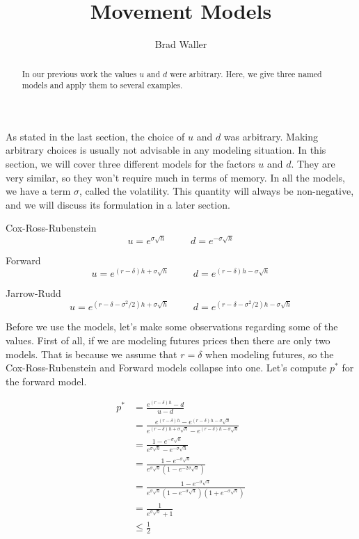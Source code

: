 \documentclass{ximera}
\author{Brad Waller}
\title{Movement Models}
\begin{document}
\begin{abstract}
In our previous work the values $u$ and $d$ were arbitrary. Here, we give three named models and apply them to several examples.
\end{abstract}

\maketitle

As stated in the last section, the choice of $u$ and $d$ was arbitrary. Making arbitrary choices is usually not advisable in any modeling situation. In this section, we will cover three different models for the factors $u$ and $d$. They are very similar, so they won't require much in terms of memory. In all the models, we have a term $\sigma$, called the volatility. This quantity will always be non-negative, and we will discuss its formulation in a later section. 

\begin{center}
Cox-Ross-Rubenstein
	\begin{equation*}
	u=e^{\sigma\sqrt{h}}	\hspace{30pt} d=e^{-\sigma\sqrt{h}}
	\end{equation*}

Forward
	\begin{equation*}
	u=e^{(r-\delta)h+\sigma\sqrt{h}}	\hspace{30pt} d=e^{(r-\delta)h-\sigma\sqrt{h}}
	\end{equation*}

Jarrow-Rudd
	\begin{equation*}
	u=e^{(r-\delta-\sigma^2/2)h+\sigma\sqrt{h}}	\hspace{30pt} d=e^{(r-\delta-\sigma^2/2)h-\sigma\sqrt{h}}
	\end{equation*}
\end{center}

Before we use the models, let's make some observations regarding some of the values. First of all, if we are modeling futures prices then there are only two models. That is because we assume that $r=\delta$ when modeling futures, so the Cox-Ross-Rubenstein and Forward models collapse into one. Let's compute $p^*$ for the forward model.

\begin{align*}
p^*	&=\frac{e^{(r-\delta)h}-d}{u-d}\\
	&=\frac{e^{(r-\delta)h}-e^{(r-\delta)h-\sigma\sqrt{h}}}{e^{(r-\delta)h+\sigma\sqrt{h}}-e^{(r-\delta)h-\sigma\sqrt{h}}}\\
	&=\frac{1-e^{-\sigma\sqrt{h}}}{e^{\sigma\sqrt{h}}-e^{-\sigma\sqrt{h}}}\\
	&=\frac{1-e^{-\sigma\sqrt{h}}}{e^{\sigma\sqrt{h}}(1-e^{-2\sigma\sqrt{h}})}\\
	&=\frac{1-e^{-\sigma\sqrt{h}}}{e^{\sigma\sqrt{h}}(1-e^{-\sigma\sqrt{h}})(1+e^{-\sigma\sqrt{h}})}\\
	&=\frac{1}{e^{\sigma\sqrt{h}}+1}\\
	&\leq\frac{1}{2}
\end{align*}
\end{document}
